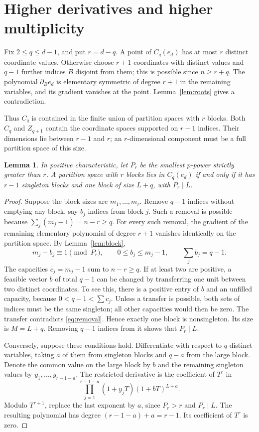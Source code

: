 \documentclass[11pt]{article}
\newtheorem{lemma}[theorem]{Lemma}
\theoremstyle{remark}
\begin{document}
\section{Higher derivatives and higher multiplicity}\label{sec:higher}

Fix $2\le q\le d-1$, and put $r=d-q$. A point of $C_q(e_d)$ has
at most $r$ distinct coordinate values. Otherwise choose $r+1$
coordinates with distinct values and $q-1$ further indices $B$
disjoint from them; this is possible since $n\ge r+q$. The
polynomial $\partial_Be_d$ is elementary symmetric of degree
$r+1$ in the remaining variables, and its gradient vanishes at
the point. Lemma~\ref{lem:roots} gives a contradiction.

Thus $C_q$ is contained in the finite union of partition spaces
with $r$ blocks. Both $C_q$ and $Z_{q+1}$ contain the coordinate
spaces supported on $r-1$ indices. Their dimensions lie between
$r-1$ and $r$; an $r$-dimensional component must be a full partition
space of this size.

\begin{lemma}\label{lem:oneblock}
In positive characteristic, let $P_r$ be the smallest $p$-power
strictly greater than $r$. A partition space with $r$ blocks lies
in $C_q(e_d)$ if and only if it has $r-1$ singleton blocks and
one block of size $L+q$, with $P_r\mid L$.
\end{lemma}
\begin{proof}
Suppose the block sizes are $m_1,\ldots,m_r$. Remove $q-1$
indices without emptying any block, say $b_j$ indices from block
$j$. Such a removal is possible because $\sum_j(m_j-1)=n-r\ge q$.
For every such removal, the gradient of the remaining elementary
polynomial of degree $r+1$ vanishes identically on the partition space. By
Lemma~\ref{lem:block},
\begin{equation}
 m_j-b_j\equiv1\pmod{P_r},\qquad
 0\le b_j\le m_j-1,\qquad\sum_jb_j=q-1.\label{eq:removal}
\end{equation}
The capacities $c_j=m_j-1$ sum to $n-r\ge q$. If at least two
are positive, a feasible vector $b$ of total $q-1$ can be changed
by transferring one unit between two distinct coordinates. To see
this, there is a positive entry of $b$ and an unfilled capacity,
because $0<q-1<\sum c_j$. Unless a transfer is possible, both
sets of indices must be the same singleton; all other capacities
would then be zero. The transfer contradicts \eqref{eq:removal}.
Hence exactly one block is nonsingleton. Its size is $M=L+q$.
Removing $q-1$ indices from it shows that $P_r\mid L$.

Conversely, suppose these conditions hold. Differentiate with respect
to $q$ distinct variables, taking $a$ of them from singleton blocks
and $q-a$ from the large block. Denote the common value on the large
block by $b$ and the remaining singleton values by
$y_1,\ldots,y_{r-1-a}$. The restricted derivative is the coefficient
of $T^r$ in
\[
 \prod_{j=1}^{r-1-a}(1+y_jT)(1+bT)^{L+a}.
\]
Modulo $T^{r+1}$, replace the last exponent by $a$, since
$P_r>r$ and $P_r\mid L$. The resulting polynomial has degree
$(r-1-a)+a=r-1$. Its coefficient of $T^r$ is zero.
\end{proof}
\end{document}

